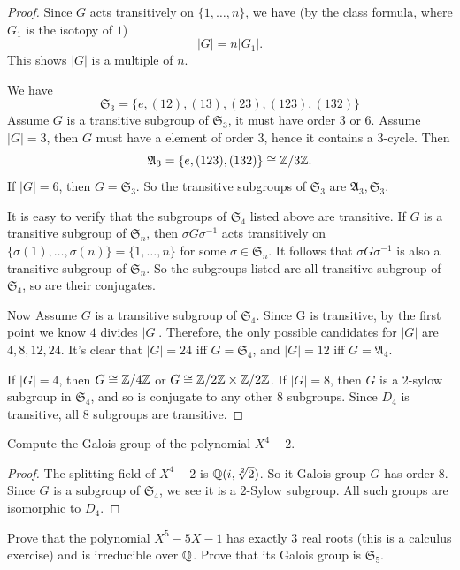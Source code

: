 \begin{proof}
Since $G$ acts transitively on $\{1,\dots,n\}$, we have (by the class formula, where $G_1$ is the isotopy of $1$)
\[|G|=n|G_1|.\]
This shows $|G|$ is a multiple of $n$.\par
We have
\[\mathfrak{S}_3=\{e,(12),(13),(23),(123),(132)\}\]
Assume $G$ is a transitive subgroup of $\mathfrak{S}_3$, it must have order $3$ or $6$. Assume $|G|=3$, then $G$ must have a element of order $3$, hence it contains a $3$-cycle. Then
\[\mathfrak{A}_3=\{e,(123),(132)\}\cong\mathbb{Z}/3\mathbb{Z}.\]
If $|G|=6$, then $G=\mathfrak{S}_3$. So the transitive subgroups of $\mathfrak{S}_3$ are $\mathfrak{A}_3,\mathfrak{S}_3$.\par
It is easy to verify that the subgroups of $\mathfrak{S}_4$ listed above are transitive. If $G$ is a transitive subgroup of $\mathfrak{S}_n$, then $\sigma G\sigma^{-1}$ acts transitively on $\{\sigma(1),\dots,\sigma(n)\}=\{1,\dots,n\}$ for some $\sigma\in\mathfrak{S}_n$. It follows that $\sigma G\sigma^{-1}$ is also a transitive subgroup of $\mathfrak{S}_n$. So the subgroups listed are all transitive subgroup of $\mathfrak{S}_4$, so are their conjugates.\par
Now Assume $G$ is a transitive subgroup of $\mathfrak{S}_4$. Since G is transitive, by the first point we know $4$ divides $|G|$. Therefore, the only possible candidates for $|G|$ are $4,8,12,24$. It's clear that $|G|=24$ iff $G=\mathfrak{S}_4$, and $|G|=12$ iff $G=\mathfrak{A}_4$.\par
If $|G|=4$, then $G\cong\mathbb{Z}/4\mathbb{Z}$ or $G\cong \mathbb{Z}/2\mathbb{Z}\times\mathbb{Z}/2\mathbb{Z}$. If $|G|=8$, then $G$ is a $2$-sylow subgroup in $\mathfrak{S}_4$, and so is conjugate to any other $8$ subgroups. Since $D_4$ is transitive, all $8$ subgroups are transitive.
\end{proof}
\begin{exercise}
Compute the Galois group of the polynomial $X^4-2$.
\end{exercise}
\begin{proof}
The splitting field of $X^4-2$ is $\mathbb{Q}(i,\sqrt[2]{2})$. So it Galois group $G$ has order $8$. Since $G$ is a subgroup of $\mathfrak{S}_4$, we see it is a $2$-Sylow subgroup. All such groups are isomorphic to $D_4$.
\end{proof}
\begin{exercise}
Prove that the polynomial $X^5-5X-1$ has exactly $3$ real roots (this is a calculus exercise) and is irreducible over $\mathbb{Q}$. Prove that its Galois group is $\mathfrak{S}_5$.
\end{exercise}
